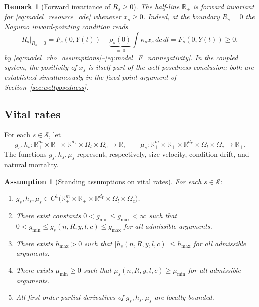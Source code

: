 \documentclass[pdflatex,sn-mathphys-num]{sn-jnl}%
\newtheorem{assumption}[theorem]{Assumption}
\newtheorem{remark}[theorem]{Remark}
\begin{document}
\begin{remark}[Forward invariance of \(R_s\ge 0\)]\label{rem:resource_invariance}
The half-line \(\mathbb R_+\) is forward invariant for \eqref{eq:model_resource_ode}
whenever \(x_s\ge 0\). Indeed, at the boundary \(R_s=0\) the Nagumo \cite{Nagumo1942,gao2022rolling} inward-pointing
condition reads
\[
\dot R_s\big|_{R_s=0}
=
F_s(0,Y(t))-\underbrace{\rho_s(0)}_{=\,0}
\int\kappa_s x_s\,dc\,dl
=
F_s(0,Y(t))\ge 0,
\]
by \eqref{eq:model_rho_assumptions}--\eqref{eq:model_F_nonnegativity}. In the coupled
system, the positivity of \(x_s\) is itself part of the well-posedness conclusion; both
are established simultaneously in the fixed-point argument of
Section~\ref{sec:wellposedness}.
\end{remark}

\subsection{Vital rates}
For each \(s\in\mathcal S\), let
\[
g_s,h_s:\mathbb R_+^m\times\mathbb R_+\times\mathbb R^{d_Y}\times\Omega_l\times\Omega_c\to\mathbb R,
\qquad
\mu_s:\mathbb R_+^m\times\mathbb R_+\times\mathbb R^{d_Y}\times\Omega_l\times\Omega_c\to\mathbb R_+.
\]
The functions \(g_s,h_s,\mu_s\) represent, respectively, size velocity,
condition drift, and natural mortality.
\begin{assumption}[Standing assumptions on vital rates]\label{ass:model_vital_rates}
For each \(s\in\mathcal S\):
\begin{enumerate}[label=\textup{(V\arabic*)}]
\item\label{item:V1}
\(g_s,h_s,\mu_s
\in
C^1\big(\mathbb R_+^m\times\mathbb R_+\times\mathbb R^{d_Y}\times\Omega_l\times\Omega_c\big)\).
\item\label{item:V2}
There exist constants \(0<g_{\min}\le g_{\max}<\infty\) such that
\(0<g_{\min}\le g_s(n,R,y,l,c)\le g_{\max}\)
for all admissible arguments.
\item\label{item:V3}
There exists \(h_{\max}>0\) such that
\(|h_s(n,R,y,l,c)|\le h_{\max}\)
for all admissible arguments.
\item\label{item:V4}
There exists \(\mu_{\min}\ge 0\) such that
\(\mu_s(n,R,y,l,c)\ge \mu_{\min}\)
for all admissible arguments.
\item\label{item:V5}
All first-order partial derivatives of \(g_s,h_s,\mu_s\) are locally bounded.
\end{enumerate}
\end{assumption}
\end{document}
